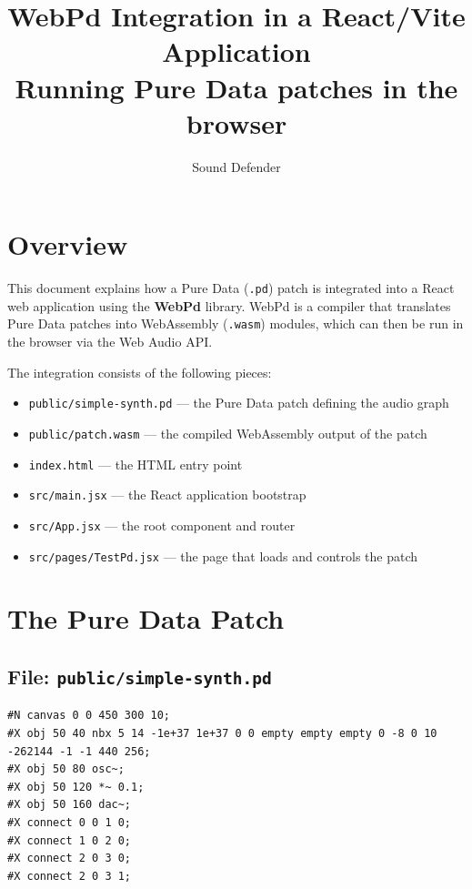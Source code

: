 \documentclass[12pt,a4paper]{article}
\title{\textbf{WebPd Integration in a React/Vite Application}\\
\large Running Pure Data patches in the browser}
\author{Sound Defender}
\date{}
\begin{document}
\maketitle
\tableofcontents
\newpage

\section{Overview}

This document explains how a Pure Data (\texttt{.pd}) patch is integrated into a React web application using the \textbf{WebPd} library. WebPd is a compiler that translates Pure Data patches into WebAssembly (\texttt{.wasm}) modules, which can then be run in the browser via the Web Audio API.

The integration consists of the following pieces:

\begin{itemize}
  \item \texttt{public/simple-synth.pd} — the Pure Data patch defining the audio graph
  \item \texttt{public/patch.wasm} — the compiled WebAssembly output of the patch
  \item \texttt{index.html} — the HTML entry point
  \item \texttt{src/main.jsx} — the React application bootstrap
  \item \texttt{src/App.jsx} — the root component and router
  \item \texttt{src/pages/TestPd.jsx} — the page that loads and controls the patch
\end{itemize}

\section{The Pure Data Patch}

\subsection{File: \texttt{public/simple-synth.pd}}

\begin{lstlisting}[style=pd, caption={simple-synth.pd}]
#N canvas 0 0 450 300 10;
#X obj 50 40 nbx 5 14 -1e+37 1e+37 0 0 empty empty empty 0 -8 0 10 -262144 -1 -1 440 256;
#X obj 50 80 osc~;
#X obj 50 120 *~ 0.1;
#X obj 50 160 dac~;
#X connect 0 0 1 0;
#X connect 1 0 2 0;
#X connect 2 0 3 0;
#X connect 2 0 3 1;
\end{lstlisting}
\end{document}

